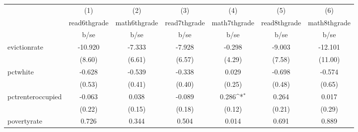 {
\def\sym#1{\ifmmode^{#1}\else\(^{#1}\)\fi}
\begin{tabular}{l*{6}{c}}
\hline\hline
            &\multicolumn{1}{c}{(1)}           &\multicolumn{1}{c}{(2)}           &\multicolumn{1}{c}{(3)}           &\multicolumn{1}{c}{(4)}           &\multicolumn{1}{c}{(5)}           &\multicolumn{1}{c}{(6)}           \\
            &\multicolumn{1}{c}{read6thgrade}  &\multicolumn{1}{c}{math6thgrade}  &\multicolumn{1}{c}{read7thgrade}  &\multicolumn{1}{c}{math7thgrade}  &\multicolumn{1}{c}{read8thgrade}  &\multicolumn{1}{c}{math8thgrade}  \\
            &                     b/se         &                     b/se         &                     b/se         &                     b/se         &                     b/se         &                     b/se         \\
\hline
evictionrate&                  -10.920         &                   -7.333         &                   -7.928         &                   -0.298         &                   -9.003         &                  -12.101         \\
            &                   (8.60)         &                   (6.61)         &                   (6.57)         &                   (4.29)         &                   (7.58)         &                  (11.00)         \\
pctwhite    &                   -0.628         &                   -0.539         &                   -0.338         &                    0.029         &                   -0.698         &                   -0.574         \\
            &                   (0.53)         &                   (0.41)         &                   (0.40)         &                   (0.25)         &                   (0.48)         &                   (0.65)         \\
pctrenteroccupied&                   -0.063         &                    0.038         &                   -0.089         &                    0.286\sym{*}  &                    0.264         &                    0.017         \\
            &                   (0.22)         &                   (0.15)         &                   (0.18)         &                   (0.12)         &                   (0.21)         &                   (0.29)         \\
povertyrate &                    0.726         &                    0.344         &                    0.504         &                    0.014         &                    0.691         &                    0.889         \\

\end{tabular}}
